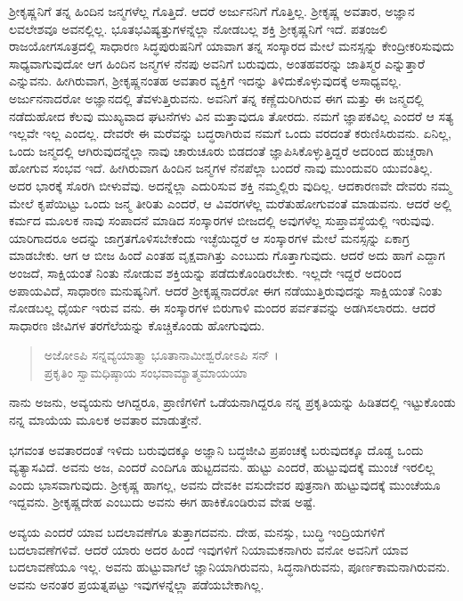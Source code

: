 ಶ್ರೀಕೃಷ್ಣನಿಗೆ ತನ್ನ ಹಿಂದಿನ ಜನ್ಮಗಳೆಲ್ಲ ಗೊತ್ತಿದೆ. ಆದರೆ ಅರ್ಜುನನಿಗೆ ಗೊತ್ತಿಲ್ಲ. ಶ್ರೀಕೃಷ್ಣ ಅವತಾರ, ಅಜ್ಞಾನ ಲವಲೇಶವೂ ಅವನಲ್ಲಿಲ್ಲ. ಭೂತಭವಿಷ್ಯತ್ತುಗಳನ್ನೆಲ್ಲಾ ನೋಡಬಲ್ಲ ಶಕ್ತಿ ಶ್ರೀಕೃಷ್ಣನಿಗೆ ಇದೆ. ಪತಂಜಲಿ ರಾಜಯೋಗಸೂತ್ರದಲ್ಲಿ ಸಾಧಾರಣ ಸಿದ್ಧಪುರುಷನಿಗೆ ಯಾವಾಗ ತನ್ನ ಸಂಸ್ಕಾರದ ಮೇಲೆ ಮನಸ್ಸನ್ನು ಕೇಂದ್ರೀಕರಿಸುವುದು ಸಾಧ್ಯವಾಗುವುದೋ ಆಗ ಹಿಂದಿನ ಜನ್ಮಗಳ ನೆನಪು ಅವನಿಗೆ ಬರುವುದು, ಅಂತಹವರನ್ನು ಜಾತಿಸ್ಮರ ಎನ್ನುತ್ತಾರೆ ಎನ್ನುವನು. ಹೀಗಿರುವಾಗ, ಶ್ರೀಕೃಷ್ಣನಂತಹ ಅವತಾರ ವ್ಯಕ್ತಿಗೆ ಇದನ್ನು ತಿಳಿದುಕೊಳ್ಳುವುದಕ್ಕೆ ಅಸಾಧ್ಯವಲ್ಲ. ಅರ್ಜುನನಾದರೋ ಅಜ್ಞಾನದಲ್ಲಿ ತೆವಳುತ್ತಿರುವನು. ಅವನಿಗೆ ತನ್ನ ಕಣ್ಣೆದುರಿಗಿರುವ ಈಗ ಮತ್ತು ಈ ಜನ್ಮದಲ್ಲಿ ನಡೆದುಹೋದ ಕೆಲವು ಮುಖ್ಯವಾದ ಘಟನೆಗಳು ವಿನ ಮತ್ತಾವುದೂ ತೋರದು. ನಮಗೆ ಜ್ಞಾಪಕವಿಲ್ಲ ಎಂದರೆ ಆ ಸತ್ಯ ಇಲ್ಲವೇ ಇಲ್ಲ ಎಂದಲ್ಲ. ದೇವರೇ ಈ ಮರೆವನ್ನು ಬದ್ಧರಾಗಿರುವ ನಮಗೆ ಒಂದು ವರದಂತೆ ಕರುಣಿಸಿರುವನು. ಏನಿಲ್ಲ, ಒಂದು ಜನ್ಮದಲ್ಲಿ ಆಗಿರುವುದನ್ನೆಲ್ಲಾ ನಾವು ಚಾರುಚೂರು ಬಿಡದಂತೆ ಜ್ಞಾಪಿಸಿಕೊಳ್ಳುತ್ತಿದ್ದರೆ ಅದರಿಂದ ಹುಚ್ಚರಾಗಿ ಹೋಗುವ ಸಂಭವ ಇದೆ. ಹೀಗಿರುವಾಗ ಹಿಂದಿನ ಜನ್ಮಗಳ ನೆನಪೆಲ್ಲಾ ಬಂದರೆ ನಾವು ಮುಂದುವರಿ ಯುವಂತಿಲ್ಲ. ಅದರ ಭಾರಕ್ಕೆ ಸೊರಗಿ ಬೀಳುವೆವು. ಅದನ್ನೆಲ್ಲಾ ಎದುರಿಸುವ ಶಕ್ತಿ ನಮ್ಮಲ್ಲಿರು ವುದಿಲ್ಲ. ಆದಕಾರಣವೇ ದೇವರು ನಮ್ಮ ಮೇಲೆ ಕೃಪೆಯಿಟ್ಟು ಒಂದು ಜನ್ಮ ತೀರಿತು ಎಂದರೆ, ಆ ವಿವರಗಳೆಲ್ಲ ಮರೆತುಹೋಗುವಂತೆ ಮಾಡುವನು. ಆದರೆ ಅಲ್ಲಿ ಕರ್ಮದ ಮೂಲಕ ನಾವು ಸಂಪಾದನೆ ಮಾಡಿದ ಸಂಸ್ಕಾರಗಳ ಬೀಜದಲ್ಲಿ ಅವುಗಳೆಲ್ಲ ಸುಪ್ತಾವಸ್ಥೆಯಲ್ಲಿ ಇರುವುವು. ಯಾರಿಗಾದರೂ ಅದನ್ನು ಜಾಗ್ರತಗೊಳಿಸಬೇಕೆಂದು ಇಚ್ಛೆಯಿದ್ದರೆ ಆ ಸಂಸ್ಕಾರಗಳ ಮೇಲೆ ಮನಸ್ಸನ್ನು ಏಕಾಗ್ರ ಮಾಡಬೇಕು. ಆಗ ಆ ಬೀಜ ಹಿಂದೆ ಎಂತಹ ವೃಕ್ಷವಾಗಿತ್ತು ಎಂಬುದು ಗೊತ್ತಾಗುವುದು. ಆದರೆ ಅದು ಹಾಗೆ ಎದ್ದಾಗ ಅಂಜದೆ, ಸಾಕ್ಷಿಯಂತೆ ನಿಂತು ನೋಡುವ ಶಕ್ತಿಯನ್ನು ಪಡೆದುಕೊಂಡಿರಬೇಕು. ಇಲ್ಲದೇ ಇದ್ದರೆ ಅದರಿಂದ ಅಪಾಯವಿದೆ, ಸಾಧಾರಣ ಮನುಷ್ಯನಿಗೆ. ಆದರೆ ಶ್ರೀಕೃಷ್ಣನಾದರೋ ಈಗ ನಡೆಯುತ್ತಿರುವುದನ್ನು ಸಾಕ್ಷಿಯಂತೆ ನಿಂತು ನೋಡಬಲ್ಲ ಧೈರ್ಯ ಇರುವ ವನು. ಈ ಸಂಸ್ಕಾರಗಳ ಬಿರುಗಾಳಿ ಮಂದರ ಪರ್ವತವನ್ನು ಅಡಗಿಸಲಾರದು. ಆದರೆ ಸಾಧಾರಣ ಜೀವಿಗಳ ತರಗೆಲೆಯನ್ನು ಕೊಚ್ಚಿಕೊಂಡು ಹೋಗುವುದು.

\begin{verse}
ಅಜೋಽಪಿ ಸನ್ನವ್ಯಯಾತ್ಮಾ ಭೂತಾನಾಮೀಶ್ವರೋಽಪಿ ಸನ್​ ।\\ಪ್ರಕೃತಿಂ ಸ್ವಾಮಧಿಷ್ಠಾಯ ಸಂಭವಾಮ್ಯಾತ್ಮಮಾಯಯಾ 
\end{verse}

{\small ನಾನು ಅಜನು, ಅವ್ಯಯನು ಆಗಿದ್ದರೂ, ಪ್ರಾಣಿಗಳಿಗೆ ಒಡೆಯನಾಗಿದ್ದರೂ ನನ್ನ ಪ್ರಕೃತಿಯನ್ನು ಹಿಡಿತದಲ್ಲಿ ಇಟ್ಟುಕೊಂಡು ನನ್ನ ಮಾಯೆಯ ಮೂಲಕ ಅವತಾರ ಮಾಡುತ್ತೇನೆ.}

ಭಗವಂತ ಅವತಾರದಂತೆ ಇಳಿದು ಬರುವುದಕ್ಕೂ ಅಜ್ಞಾನಿ ಬದ್ಧಜೀವಿ ಪ್ರಪಂಚಕ್ಕೆ ಬರುವುದಕ್ಕೂ ದೊಡ್ಡ ಒಂದು ವ್ಯತ್ಯಾಸವಿದೆ. ಅವನು ಅಜ, ಎಂದರೆ ಎಂದಿಗೂ ಹುಟ್ಟದವನು. ಹುಟ್ಟು ಎಂದರೆ, ಹುಟ್ಟುವುದಕ್ಕೆ ಮುಂಚೆ ಇರಲಿಲ್ಲ ಎಂದು ಭಾಸವಾಗುವುದು. ಶ್ರೀಕೃಷ್ಣ ಹಾಗಲ್ಲ, ಅವನು ದೇವಕೀ ವಸುದೇವರ ಪುತ್ರನಾಗಿ ಹುಟ್ಟುವುದಕ್ಕೆ ಮುಂಚೆಯೂ ಇದ್ದವನು. ಶ್ರೀಕೃಷ್ಣದೇಹ ಎಂಬುದು ಅವನು ಈಗ ಹಾಕಿಕೊಂಡಿರುವ ವೇಷ ಅಷ್ಟೆ.

ಅವ್ಯಯ ಎಂದರೆ ಯಾವ ಬದಲಾವಣೆಗೂ ತುತ್ತಾಗದವನು. ದೇಹ, ಮನಸ್ಸು, ಬುದ್ಧಿ ಇಂದ್ರಿಯಗಳಿಗೆ ಬದಲಾವಣೆಗಳಿವೆ. ಆದರೆ ಯಾರು ಅದರ ಹಿಂದೆ ಇವುಗಳಿಗೆ ನಿಯಾಮಕನಾಗಿರು ವನೋ ಅವನಿಗೆ ಯಾವ ಬದಲಾವಣೆಯೂ ಇಲ್ಲ. ಅವನು ಹುಟ್ಟುವಾಗಲೆ ಜ್ಞಾನಿಯಾಗಿರುವನು, ಸಿದ್ಧನಾಗಿರುವನು, ಪೂರ್ಣಕಾಮನಾಗಿರುವನು. ಅವನು ಅನಂತರ ಪ್ರಯತ್ನಪಟ್ಟು ಇವುಗಳನ್ನೆಲ್ಲಾ ಪಡೆಯಬೇಕಾಗಿಲ್ಲ.

